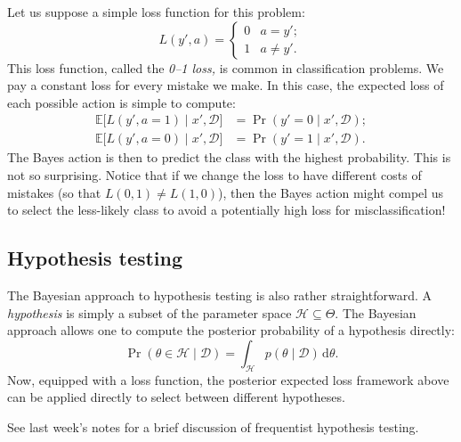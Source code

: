 \documentclass{article}
\newcommand{\given}{\mid}
\newcommand{\mc}[1]{\mathcal{#1}}
\newcommand{\data}{\mc{D}}
\newcommand{\intd}[1]{\,\mathrm{d}{#1}}
\begin{document}
Let us suppose a simple loss function for this problem:
\begin{equation*}
  L(y', a) =
  \begin{cases}
    0 & a = y'; \\
    1 & a \neq y'.
  \end{cases}
\end{equation*}
This loss function, called the \emph{0--1 loss,} is common in
classification problems.  We pay a constant loss for every mistake we
make.  In this case, the expected loss of each possible action is
simple to compute:
\begin{align*}
  \mathbb{E}\bigl[L(y', a = 1) \given x', \data\bigr]
  &=
  \Pr(y' = 0 \given x', \data);
  \\
  \mathbb{E}\bigl[L(y', a = 0) \given x', \data\bigr]
  &=
  \Pr(y' = 1 \given x', \data).
\end{align*}
The Bayes action is then to predict the class with the highest
probability.  This is not so surprising.  Notice that if we change the
loss to have different costs of mistakes (so that $L(0, 1) \neq L(1,
0)$), then the Bayes action might compel us to select the less-likely
class to avoid a potentially high loss for misclassification!

\subsection*{Hypothesis testing}

The Bayesian approach to hypothesis testing is also rather
straightforward.  A \emph{hypothesis} is simply a subset of the
parameter space $\mc{H} \subseteq \Theta$.  The Bayesian approach
allows one to compute the posterior probability of a hypothesis
directly:
\begin{equation*}
  \Pr(\theta \in \mc{H} \given \data)
  =
  \int_{\mc{H}}
  p(\theta \given \data)
  \intd{\theta}.
\end{equation*}
Now, equipped with a loss function, the posterior expected loss
framework above can be applied directly to select between different
hypotheses.

See last week's notes for a brief discussion of frequentist
hypothesis testing.
\end{document}
